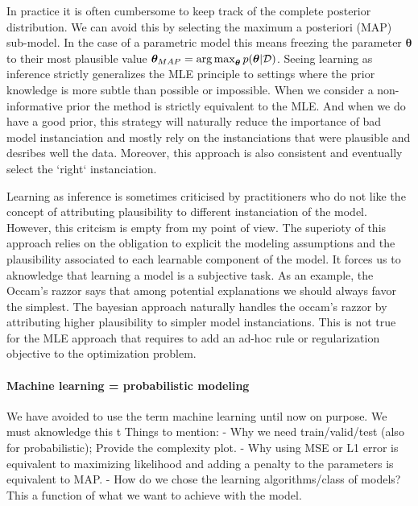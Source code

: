 In practice it is often cumbersome to keep track of the complete posterior distribution. We can avoid this by selecting the maximum a posteriori (MAP) sub-model. In the case of a parametric model this means freezing the parameter $\bm \theta$ to their most plausible value $\bm \theta_{MAP} = \operatorname*{arg\,max}_{\bm \theta} p(\bm \theta | \mathcal{D})$. Seeing learning as inference strictly generalizes the MLE principle to settings where the prior knowledge is more subtle than possible or impossible. When we consider a non-informative prior the method is strictly equivalent to the MLE. And when we do have a good prior, this strategy will naturally reduce the importance of bad model instanciation and mostly rely on the instanciations that were plausible and desribes well the data. Moreover, this approach is also consistent and eventually select the `right` instanciation.

Learning as inference is sometimes criticised by practitioners who do not like the concept of attributing plausibility to different instanciation of the model. However, this critcism is empty from my point of view. The superioty of this approach relies on the obligation to explicit the modeling assumptions and the plausibility associated to each learnable component of the model. It forces us to aknowledge that learning a model is a subjective task. As an example, the Occam's razzor says that among potential explanations we should always favor the simplest. The bayesian approach naturally handles the occam's razzor by attributing higher plausibility to simpler model instanciations. This is not true for the MLE approach that requires to add an ad-hoc rule or regularization objective to the optimization problem.

%
\paragraph{Machine learning = probabilistic modeling}
We have avoided to use the term machine learning until now on purpose. We must aknowledge this t
Things to mention:
- Why we need train/valid/test (also for probabilistic); Provide the complexity plot.
- Why using MSE or L1 error is equivalent to maximizing likelihood and adding a penalty to the parameters is equivalent to MAP.
- How do we chose the learning algorithms/class of models? This a function of what we want to achieve with the model.

